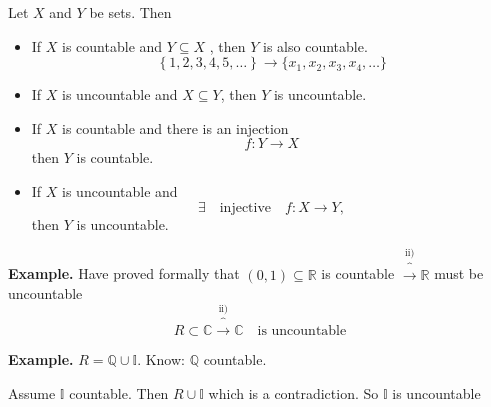 \documentclass{article}
\theoremstyle{remark}
\begin{document}
\newpage
  \begin{lemma}
    Let $X$ and $Y$ be sets. Then 
    \begin{itemize}
      \item If $X$ is countable and $ Y \subseteq  X$ , then $Y$ is also countable. \[
      \left\{ 1,2,3,4,5, \ldots \right\} \to \{x_{1}, x_{2} , x_{3}, x_{4} , \ldots\} 
      \] 
    \item If $X$ is uncountable and $X \subseteq  Y$, then $Y$ is uncountable. 
    \item If $X$ is countable and there is an injection \[
    f: Y \to X   
    \] 
    then $Y$ is countable.
  \item If $X$ is uncountable and \[
  \exists \quad  \text{injective} \quad  f: X \to Y,   
  \] 
  then $Y$ is uncountable.
    \end{itemize}
  \end{lemma}
   \begin{tcolorbox}
     \textbf{Example.} Have proved formally that $\left( 0,1 \right) \subseteq  \mathbb{R} $ is countable $\overbrace{\to}^\text{ii)}  \mathbb{R} $ must be uncountable \[
       R \subset \mathbb{C}  \overbrace{\longrightarrow}^\text{ii)} \mathbb{C} \quad \text{is uncountable} 
     \] 
   \end{tcolorbox}

   \begin{tcolorbox}
     \textbf{Example.} $R = \mathbb{Q}  \cup \mathbb{I}$. Know: $\mathbb{Q} $ countable.  \par
     Assume $\mathbb{I}$ countable. Then $R \cup \mathbb{I}$ which is a contradiction. So $\mathbb{I}$ is uncountable
   \end{tcolorbox}




\end{document}
